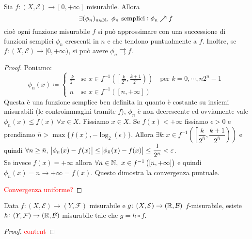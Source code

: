 \begin{proposition}
	Sia $ f\colon (X,\mathcal{E}) \to [0, +\infty] $ misurabile. Allora
	\[ \exists (\phi_n)_{n\in\mathbb{N}},\ \phi_n \text{ semplici} : \phi_n \nearrow f \]
	cioè ogni funzione misurabile $ f $ si può approssimare con una successione di funzioni semplici $ \phi_n $ crescenti in $ n $ e che tendono puntualmente a $ f $.
	Inoltre, se $ f\colon (X,\mathcal{E}) \to [0,+\infty) $, si può avere $ \phi_n \rightrightarrows f $.
\end{proposition}
\begin{proof}
	Poniamo:
	\[ \phi_n (x) \coloneqq
    \begin{cases}
			\frac{k}{2^n} & \text{se } x \in f^{-1}\left( \left[\frac{k}{2^n}, \frac{k+1}{2^n} \right)  \right) \quad\text{per } k=0,\cdots,n2^n-1\\
			n             & \text{se } x \in f^{-1}\left( [n, +\infty] \right)
		\end{cases}
	 \]
	Questa è una funzione semplice ben definita in quanto è costante su insiemi misurabili (le controimmagini tramite $ f $), $ \phi_n $ è non decrescente ed ovviamente vale $ \phi_n(x) \leq f(x)\ \forall x\in X $.
	Fissiamo $ x\in X $. Se $ f(x)<+\infty $ fissiamo $ \epsilon > 0 $ e prendiamo $ \bar n > \max\{ f(x), -\log_2(\epsilon) \} $. Allora $ \exists k : x\in f^{-1}\left( \left[\dfrac{k}{2^{\bar n} }, \dfrac{k+1}{2^{\bar n} } \right) \right) $ e quindi $ \forall n\ge \bar{n}, \ \abs{\phi_n(x) - f(x)} \leq \abs{\phi_{\bar{n}}(x) - f(x)} \leq \dfrac{1}{2^{\bar n}} < \epsilon $. \\
	Se invece $ f(x) = +\infty $ allora $ \forall n \in \mathbb{N}, \ x\in f^{-1}\left( [n, +\infty] \right) $ e quindi $ \phi_n(x) = n \to +\infty = f(x) $. Questo dimostra la convergenza puntuale.

	\textcolor{red}{Convergenza uniforme?}
\end{proof}
\begin{proposition}
	Data $ f \colon (X, \mathcal{E}) \to (Y, \mathcal{F}) $ misurabile e $ g \colon (X, \mathcal{E}) \to (\mathbb{R}, \mathcal{B}) $ $ f $-misurabile, esiste $ h \colon (Y, \mathcal{F}) \to (\mathbb{R}, \mathcal{B}) $ misurabile tale che $ g=h\circ f $. 
	\begin{center}
	\end{center}
\end{proposition}
\begin{proof}
	\textcolor{red}{content}
\end{proof}

